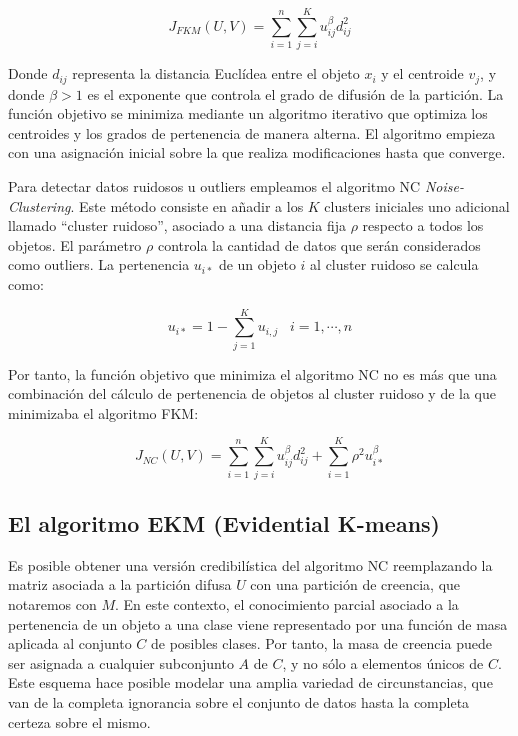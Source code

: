 \begin{equation}
J_{FKM}(U,V) = \sum_{i=1}^{n}\sum_{j=i}^{K} u_{ij}^\beta d_{ij}^2
\label{eqn8}
\end{equation}

Donde $d_{ij}$ representa la distancia Euclídea entre el objeto $x_i$ y el centroide $v_j$, y donde $\beta > 1$ es el exponente que controla el grado de difusión de la partición. La función objetivo se minimiza mediante un algoritmo iterativo que optimiza los centroides y los grados de pertenencia de manera alterna. El algoritmo empieza con una asignación inicial sobre la que realiza modificaciones hasta que converge.

Para detectar datos ruidosos u outliers empleamos el algoritmo \acs{NC} \textit{Noise-Clustering}. Este método consiste en añadir a los $K$ clusters iniciales uno adicional llamado ``cluster ruidoso'', asociado a una distancia fija $\rho$ respecto a todos los objetos. El parámetro $\rho$ controla la cantidad de datos que serán considerados como outliers. La pertenencia $u_{i*}$ de un objeto $i$ al cluster ruidoso se calcula como:

\begin{equation}
u_{i*} = 1 - \sum_{j=1}^{K} u_{i,j} \;\;\; i = {1,\cdots,n}
\label{eqn9}
\end{equation}

Por tanto, la función objetivo que minimiza el algoritmo \acs{NC} no es más que una combinación del cálculo de pertenencia de objetos al cluster ruidoso y de la que minimizaba el algoritmo \acs{FKM}:

\begin{equation}
J_{NC}(U,V) = \sum_{i=1}^{n}\sum_{j=i}^{K} u_{ij}^\beta d_{ij}^2 + \sum_{i=1}^{K} \rho^2 u_{i*}^\beta
\label{eqn10}
\end{equation}

\subsection{El algoritmo EKM (Evidential K-means)}

Es posible obtener una versión credibilística del algoritmo \acs{NC} reemplazando la matriz asociada a la partición difusa $U$ con una partición de creencia, que notaremos con $M$. En este contexto, el conocimiento parcial asociado a la pertenencia de un objeto a una clase viene representado por una función de masa aplicada al conjunto $C$ de posibles clases. Por tanto, la masa de creencia puede ser asignada a cualquier subconjunto $A$ de $C$, y no sólo a elementos únicos de $C$. Este esquema hace posible modelar una amplia variedad de circunstancias, que van de la completa ignorancia sobre el conjunto de datos hasta la completa certeza sobre el mismo.


